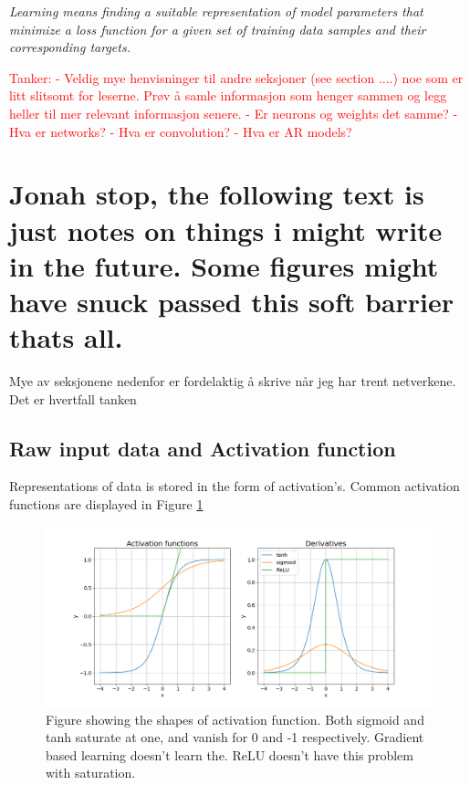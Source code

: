 \documentclass{article}
\begin{document}
\textit{Learning means finding a suitable representation of model parameters that minimize a loss function for a given set of training data samples and their corresponding targets.}


\textcolor{red}{Tanker: 
- Veldig mye henvisninger til andre seksjoner (see section ....) noe som er litt slitsomt for leserne. Prøv å samle informasjon som henger sammen og legg heller til mer relevant informasjon senere. 
- Er neurons og weights det samme?
- Hva er networks? 
- Hva er convolution? 
- Hva er AR models? 
}
\section{Jonah stop, the following text is just notes on things i might write in the future. Some figures might have snuck passed this soft barrier thats all.}

Mye av seksjonene nedenfor er fordelaktig å skrive når jeg har trent netverkene. Det er hvertfall tanken 

\subsection{Raw input data and Activation function}
Representations of data is stored in the form of activation's. Common activation functions are displayed in Figure \ref{fig:activation_func_plus}

\begin{figure}
    \centering
    \includegraphics[scale = 0.5]{activation_functions_and_derivatives.png}
    \caption{Figure showing the shapes of activation function. Both sigmoid and tanh saturate at one, and vanish for 0 and -1 respectively. Gradient based learning doesn't learn the. ReLU doesn't have this problem with saturation.}
    \label{fig:activation_func_plus}
\end{figure}


\end{document}
